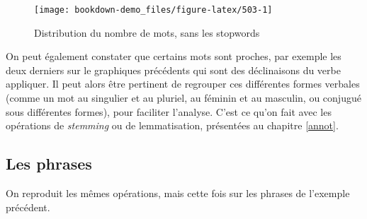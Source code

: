 \documentclass[
]{book}
\newenvironment{Shaded}{\begin{snugshade}}{\end{snugshade}}
\newcommand{\DataTypeTok}[1]{\textcolor[rgb]{0.13,0.29,0.53}{#1}}
\newcommand{\DecValTok}[1]{\textcolor[rgb]{0.00,0.00,0.81}{#1}}
\newcommand{\KeywordTok}[1]{\textcolor[rgb]{0.13,0.29,0.53}{\textbf{#1}}}
\newcommand{\NormalTok}[1]{#1}
\newcommand{\OperatorTok}[1]{\textcolor[rgb]{0.81,0.36,0.00}{\textbf{#1}}}
\begin{document}
\begin{figure}

{\centering \texttt{[image: bookdown-demo\_files/figure-latex/503-1]} 

}

\caption{Distribution du nombre de mots, sans les stopwords}\label{fig:503}
\end{figure}

On peut également constater que certains mots sont proches, par exemple les deux derniers sur le graphiques précédents qui sont des déclinaisons du verbe appliquer. Il peut alors être pertinent de regrouper ces différentes formes verbales (comme un mot au singulier et au pluriel, au féminin et au masculin, ou conjugué sous différentes formes), pour faciliter l'analyse. C'est ce qu'on fait avec les opérations de \emph{stemming} ou de lemmatisation, présentées au chapitre \ref{annot}.

\hypertarget{les-phrases}{%
\subsection{Les phrases}\label{les-phrases}}

On reproduit les mêmes opérations, mais cette fois sur les phrases de l'exemple précédent.

\begin{Shaded}
\end{Shaded}

\providecommand{\docline}[3]{\noalign{\global\setlength{\arrayrulewidth}{#1}}\arrayrulecolor[HTML]{#2}\cline{#3}}

\setlength{\tabcolsep}{2pt}

\renewcommand*{\arraystretch}{1.5}
\end{document}
